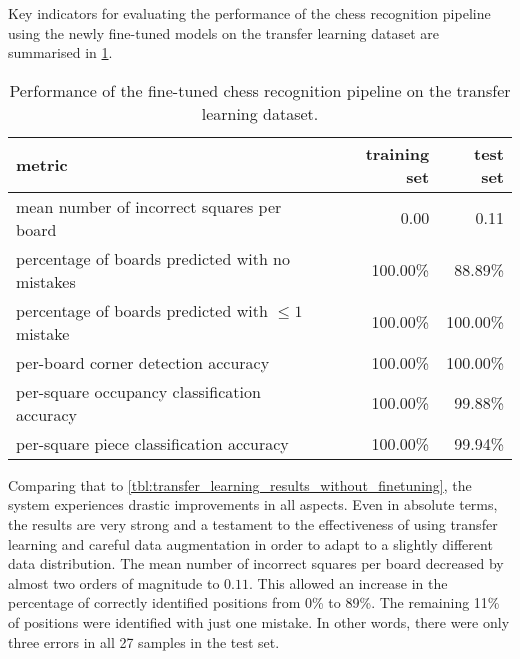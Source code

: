 \documentclass[../report.tex]{subfiles}
\begin{document}
Key indicators for evaluating the performance of the chess recognition pipeline using the newly fine-tuned models on the transfer learning dataset are summarised in \cref{tbl:transfer_learning_results}.
\begin{table}
    \centering
    \begin{tabular}{lrr}
        \toprule
        metric & training set & test set \\
        \midrule
        mean number of incorrect squares per board           & 0.00     & 0.11 \\
        percentage of boards predicted with no mistakes      & 100.00\% & 88.89\%   \\
        percentage of boards predicted with $\leq 1$ mistake & 100.00\% & 100.00\%   \\
        per-board corner detection accuracy                  & 100.00\% & 100.00\% \\
        per-square occupancy classification accuracy         & 100.00\% & 99.88\% \\
        per-square piece classification accuracy             & 100.00\% & 99.94\% \\
        \bottomrule
    \end{tabular}
    \caption{Performance of the fine-tuned chess recognition pipeline on the transfer learning dataset.}
    \label{tbl:transfer_learning_results}
\end{table}
Comparing that to \cref{tbl:transfer_learning_results_without_finetuning}, the system experiences drastic improvements in all aspects.
Even in absolute terms, the results are very strong and a testament to the effectiveness of using transfer learning and careful data augmentation in order to adapt to a slightly different data distribution.
The mean number of incorrect squares per board decreased by almost two orders of magnitude to $0.11$.
This allowed an increase in the percentage of correctly identified positions from 0\% to 89\%. 
The remaining 11\% of positions were identified with just one mistake.
In other words, there were only three errors in all 27 samples in the test set.
\end{document}
